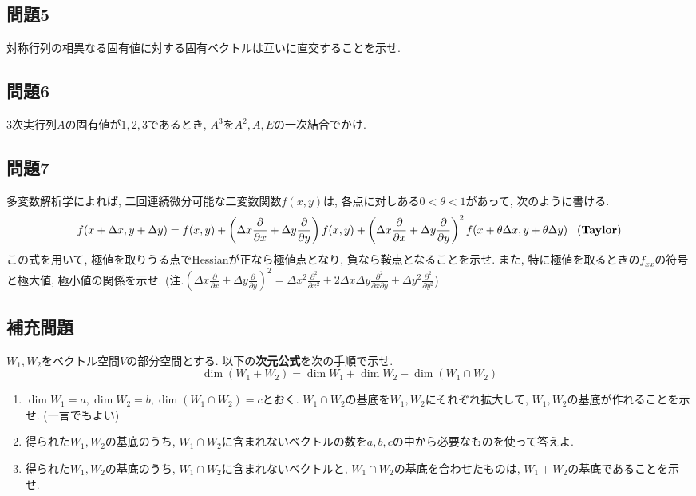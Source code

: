 \documentclass[a4j,dvipdfmx]{jsarticle}
\begin{document}
    \subsection*{問題5}
        対称行列の相異なる固有値に対する固有ベクトルは互いに直交することを示せ.
    \subsection*{問題6}
        3次実行列$A$の固有値が$1,2,3$であるとき, $A^3$を$A^2,A,E$の一次結合でかけ.
    \subsection*{問題7}
        多変数解析学によれば, 二回連続微分可能な二変数関数$f(x,y)$は, 各点に対しある$0<\theta<1$があって, 次のように書ける.
        \begin{equation*}
            f(x+\Delta x,y+\Delta y) = f(x,y)+\left(\Delta x\frac{\partial}{\partial x}+\Delta y\frac{\partial}{\partial y}\right)f(x,y)+\left(\Delta x\frac{\partial}{\partial x}+\Delta y\frac{\partial}{\partial y}\right)^2 f(x+\theta \Delta x,y+\theta \Delta y)\text{\hspace{3mm}(\textbf{Taylor})}
        \end{equation*}
        この式を用いて, 極値を取りうる点でHessianが正なら極値点となり, 負なら鞍点となることを示せ. また, 特に極値を取るときの$f_{xx}$の符号と極大値, 極小値の関係を示せ. (注.$\left(\Delta x\frac{\partial}{\partial x}+\Delta y\frac{\partial}{\partial y}\right)^2=\Delta x^2\frac{\partial^2}{\partial x^2}+2\Delta x\Delta y\frac{\partial^2}{\partial x\partial y}+\Delta y^2\frac{\partial^2}{\partial y^2}$)
    \subsection*{補充問題}
        $W_1,W_2$をベクトル空間$V$の部分空間とする. 以下の\textbf{次元公式}を次の手順で示せ.
        \begin{equation*}
            \dim(W_1+W_2)=\dim W_1+\dim W_2 - \dim(W_1\cap W_2)
        \end{equation*}
        \begin{enumerate}
            \item $\dim W_1=a, \dim W_2=b ,\dim(W_1\cap W_2)=c$とおく. $W_1\cap W_2$の基底を$W_1,W_2$にそれぞれ拡大して, $W_1,W_2$の基底が作れることを示せ. (一言でもよい)
            \item 得られた$W_1,W_2$の基底のうち, $W_1\cap W_2$に含まれないベクトルの数を$a,b,c$の中から必要なものを使って答えよ.
            \item 得られた$W_1,W_2$の基底のうち, $W_1\cap W_2$に含まれないベクトルと, $W_1\cap W_2$の基底を合わせたものは, $W_1+W_2$の基底であることを示せ.
        \end{enumerate}
\end{document}

